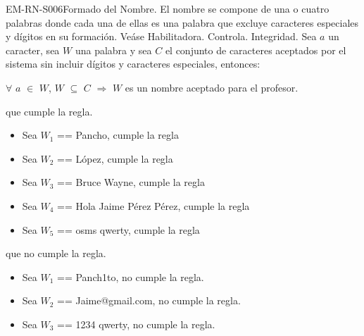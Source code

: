 \begin{BussinesRule}{EM-RN-S006}{Formado del Nombre.} 
	\BRitem[Descripción:] El nombre se compone de una o cuatro palabras donde cada una 
	de ellas es una palabra que excluye caracteres especiales y dígitos en su formación.
	Veáse 
	\BRitem[Tipo:] Habilitadora.
	\BRitem[Nivel:] Controla.
	\BRitem[Clase:] Integridad.
	\BRitem[Sentencia :] Sea $a$ un caracter, sea $W$ una palabra y sea $C$ el conjunto de caracteres
	aceptados por el sistema sin incluir dígitos y caracteres especiales, entonces:
	\begin{center}
		$\forall$ $a$ $\in$ $W$, $W$ $\subseteq$ $C$ $\Rightarrow$ $W$ es un nombre aceptado para el 
		profesor.
	\end{center}
	 que cumple la regla.
		\begin{itemize}
			\item Sea $W_{1}$ == Pancho, cumple la regla
			\item Sea $W_{2}$ == López, cumple la regla
			\item Sea $W_{3}$ == Bruce Wayne, cumple la regla
			\item Sea $W_{4}$ == Hola Jaime Pérez Pérez, cumple la regla
			\item Sea $W_{5}$ == osms qwerty, cumple la regla
		\end{itemize}
	 que no cumple la regla.
		\begin{itemize}
			\item Sea $W_{1}$ == Panch1to, no cumple la regla.
			\item Sea $W_{2}$ == Jaime@gmail.com, no cumple la regla.
			\item Sea $W_{3}$ == 1234 qwerty, no cumple la regla.
		\end{itemize}
\end{BussinesRule}

